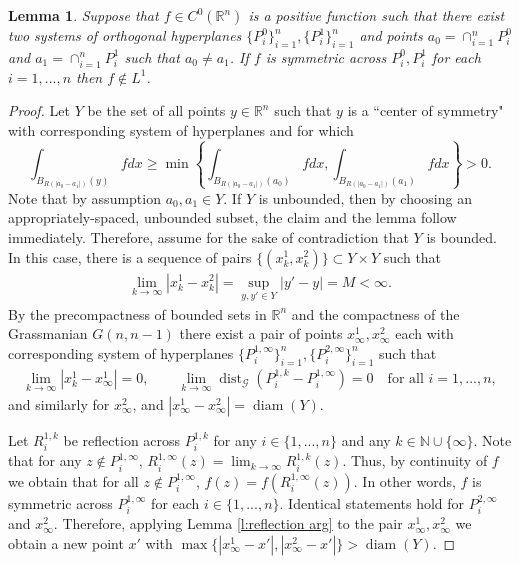 \documentclass[12pt]{amsart}
\numberwithin{equation}{section}
\theoremstyle{plain}
\newtheorem{lemma}[theorem]{Lemma}
\theoremstyle{definition}
\newcommand{\diam}{\mathop\mathrm{diam}\nolimits}
\newcommand{\dist}{\mathop\mathrm{dist}\nolimits}
\begin{document}
\begin{lemma}\label{l:reflections break L1}
    Suppose that $f \in C^0(\mathbb{R}^n)$ is a positive function such that there exist two systems of orthogonal hyperplanes $\{P_i^0\}_{i=1}^n, \{P_i^1 \}_{i=1}^n$ and points $a_0 = \cap_{i=1}^n P_i^0$ and $a_1 = \cap_{i=1}^n P_i^1$ such that $a_0 \not = a_1$.  If $f$ is symmetric across $P_i^0, P_i^1$ for each $i=1,..., n$ then $f \not \in L^1$.
\end{lemma}

\begin{proof}
Let $Y$ be the set of all points $y \in \mathbb{R}^n$ such that $y$ is a ``center of symmetry" with corresponding system of hyperplanes and for which $$\int_{B_{R(|a_0 - a_1|)}(y)}fdx \ge \min \left\{\int_{B_{R(|a_0 - a_1|)}(a_0)}fdx, \int_{B_{R(|a_0 - a_1|)}(a_1)}fdx\right\}>0.$$ Note that by assumption $a_0, a_1 \in Y$.  If $Y$ is unbounded, then by choosing an appropriately-spaced, unbounded subset, the claim and the lemma follow immediately.  Therefore, assume for the sake of contradiction that $Y$ is bounded. In this case, there is a sequence of pairs $\{(x^1_k, x^2_k)\} \subset Y\times Y$ such that  
\begin{align*}
    \lim_{k \rightarrow \infty} |x^1_k - x^2_k| = \sup_{y, y' \in Y} |y' - y| = M < \infty.
\end{align*} By the precompactness of bounded sets in $\mathbb{R}^n$ and the compactness of the Grassmanian $G(n, n-1)$ there exist a pair of points $x^1_{\infty}, x^2_{\infty}$ each with corresponding system of hyperplanes $\{P^{1,\infty}_i\}_{i=1}^n, \{P^{2,\infty}_i\}_{i=1}^n$ such that 
\begin{align*}
    \lim_{k \rightarrow \infty}|x^1_k - x^1_{\infty}| =0, \qquad \lim_{k \rightarrow \infty} \dist_{\mathcal{G}}(P^{1, k}_i - P^{1, \infty}_i) =0 \quad \text{for all }i=1, ..., n, 
\end{align*}
and similarly for $x^{2}_{\infty}$, and $|x^1_\infty - x^2_\infty| = \diam(Y)$.

Let $R^{1, k}_i$ be reflection across $P^{1,k}_i$ for any $i \in \{1, ..., n \}$ and any $k \in \mathbb{N} \cup \{\infty\}$. Note that for any $z \not \in P_i^{1, \infty}$, $R_i^{1, \infty}(z) = \lim_{k \rightarrow \infty} R_i^{1, k}(z)$.  Thus, by continuity of $f$ we obtain that for all $z \not \in P_i^{1, \infty}$, $f(z) = f(R_i^{1, \infty}(z))$.  In other words, $f$ is symmetric across $P_i^{1, \infty}$ for each $i \in \{1, ..., n \}$.  Identical statements hold for $P_i^{2, \infty}$ and $x^2_\infty$. Therefore, applying Lemma \ref{l:reflection arg} to the pair $x^1_{\infty}, x^2_{\infty}$ we obtain a new point $x'$ with $\max\{|x^1_{\infty}-x'|, |x^2_{\infty}- x'|\} > \diam(Y)$.  


\end{proof}
\end{document}
